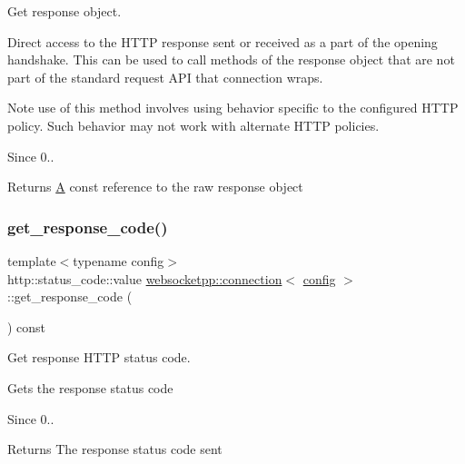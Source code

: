 Get response object. 

Direct access to the H\+T\+TP response sent or received as a part of the opening handshake. This can be used to call methods of the response object that are not part of the standard request A\+PI that connection wraps.

Note use of this method involves using behavior specific to the configured H\+T\+TP policy. Such behavior may not work with alternate H\+T\+TP policies.

\begin{DoxySince}{Since}
0..
\end{DoxySince}
\begin{DoxyReturn}{Returns}
\mbox{\hyperlink{struct_a}{A}} const reference to the raw response object 
\end{DoxyReturn}
\mbox{\label{classwebsocketpp_1_1connection_a32a160dedfda82a678bc61a18fda12b3}} 
\subsubsection{\texorpdfstring{get\+\_\+response\+\_\+code()}{get\_response\_code()}}
{\footnotesize\ttfamily template$<$typename config$>$ \\
http\+::status\+\_\+code\+::value \mbox{\hyperlink{classwebsocketpp_1_1connection}{websocketpp\+::connection}}$<$ \mbox{\hyperlink{classconfig}{config}} $>$\+::get\+\_\+response\+\_\+code (\begin{DoxyParamCaption}{ }\end{DoxyParamCaption}) const\hspace{0.3cm}{\ttfamily [inline]}}



Get response H\+T\+TP status code. 

Gets the response status code

\begin{DoxySince}{Since}
0..
\end{DoxySince}
\begin{DoxyReturn}{Returns}
The response status code sent 
\end{DoxyReturn}
\mbox{\label{classwebsocketpp_1_1connection_a72e0c94609844078fc611716c39791de}} 
